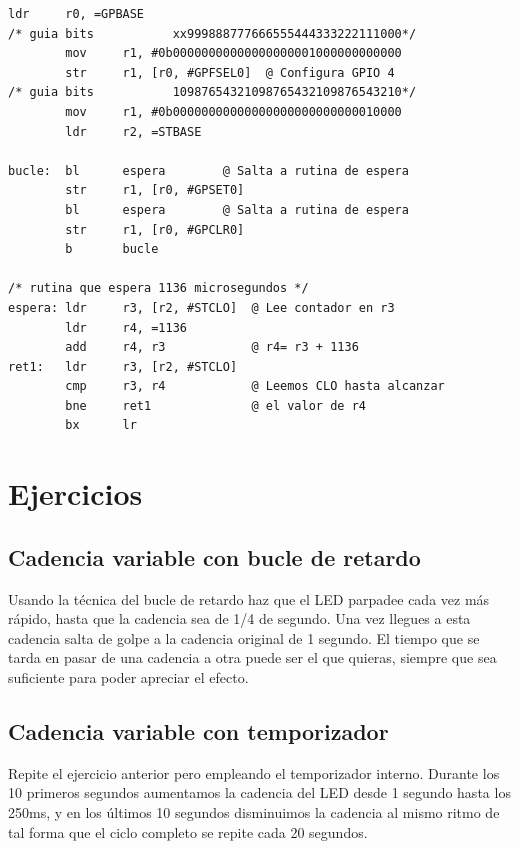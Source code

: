 \begin{lstlisting}[caption={Parte de esbn6.s},label={lst:codigoPract4_6}]
        ldr     r0, =GPBASE
/* guia bits           xx999888777666555444333222111000*/
        mov     r1, #0b00000000000000000001000000000000
        str     r1, [r0, #GPFSEL0]  @ Configura GPIO 4
/* guia bits           10987654321098765432109876543210*/
        mov     r1, #0b00000000000000000000000000010000
        ldr     r2, =STBASE

bucle:  bl      espera        @ Salta a rutina de espera
        str     r1, [r0, #GPSET0]
        bl      espera        @ Salta a rutina de espera
        str     r1, [r0, #GPCLR0]
        b       bucle

/* rutina que espera 1136 microsegundos */
espera: ldr     r3, [r2, #STCLO]  @ Lee contador en r3
        ldr     r4, =1136
        add     r4, r3            @ r4= r3 + 1136
ret1:   ldr     r3, [r2, #STCLO]
        cmp     r3, r4            @ Leemos CLO hasta alcanzar
        bne     ret1              @ el valor de r4
        bx      lr
\end{lstlisting}

\section{Ejercicios}

\subsection{Cadencia variable con bucle de retardo}

Usando la técnica del bucle de retardo haz que el LED parpadee
cada vez más rápido, hasta que la cadencia sea de 1/4 de segundo.
Una vez llegues a esta cadencia salta de golpe a la cadencia
original de 1 segundo. El tiempo que se tarda en pasar de una
cadencia a otra puede ser el que quieras, siempre que sea
suficiente para poder apreciar el efecto.

\subsection{Cadencia variable con temporizador}

Repite el ejercicio anterior pero empleando el temporizador
interno. Durante los 10 primeros segundos aumentamos la cadencia
del LED desde 1 segundo hasta los 250ms, y en los últimos 10
segundos disminuimos la cadencia al mismo ritmo de tal forma
que el ciclo completo se repite cada 20 segundos.

